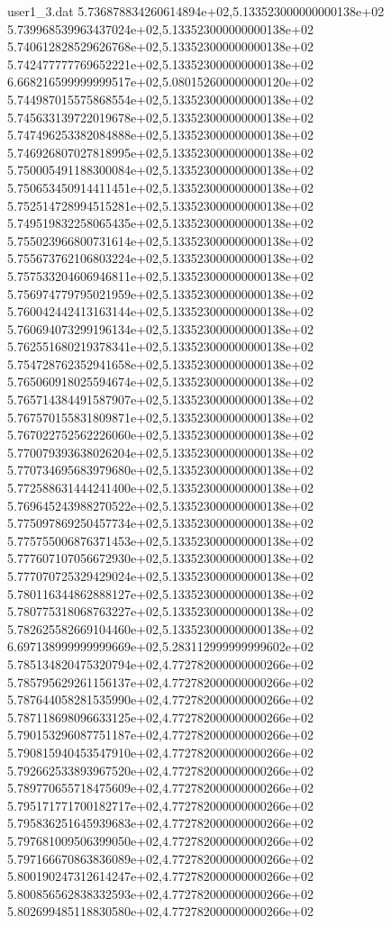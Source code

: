 \begin{filecontents}{user1_3.dat}
5.736878834260614894e+02,5.133523000000000138e+02
5.739968539963437024e+02,5.133523000000000138e+02
5.740612828529626768e+02,5.133523000000000138e+02
5.742477777769652221e+02,5.133523000000000138e+02
6.668216599999999517e+02,5.080152600000000120e+02
5.744987015575868554e+02,5.133523000000000138e+02
5.745633139722019678e+02,5.133523000000000138e+02
5.747496253382084888e+02,5.133523000000000138e+02
5.746926807027818995e+02,5.133523000000000138e+02
5.750005491188300084e+02,5.133523000000000138e+02
5.750653450914411451e+02,5.133523000000000138e+02
5.752514728994515281e+02,5.133523000000000138e+02
5.749519832258065435e+02,5.133523000000000138e+02
5.755023966800731614e+02,5.133523000000000138e+02
5.755673762106803224e+02,5.133523000000000138e+02
5.757533204606946811e+02,5.133523000000000138e+02
5.756974779795021959e+02,5.133523000000000138e+02
5.760042442413163144e+02,5.133523000000000138e+02
5.760694073299196134e+02,5.133523000000000138e+02
5.762551680219378341e+02,5.133523000000000138e+02
5.754728762352941658e+02,5.133523000000000138e+02
5.765060918025594674e+02,5.133523000000000138e+02
5.765714384491587907e+02,5.133523000000000138e+02
5.767570155831809871e+02,5.133523000000000138e+02
5.767022752562226060e+02,5.133523000000000138e+02
5.770079393638026204e+02,5.133523000000000138e+02
5.770734695683979680e+02,5.133523000000000138e+02
5.772588631444241400e+02,5.133523000000000138e+02
5.769645243988270522e+02,5.133523000000000138e+02
5.775097869250457734e+02,5.133523000000000138e+02
5.775755006876371453e+02,5.133523000000000138e+02
5.777607107056672930e+02,5.133523000000000138e+02
5.777070725329429024e+02,5.133523000000000138e+02
5.780116344862888127e+02,5.133523000000000138e+02
5.780775318068763227e+02,5.133523000000000138e+02
5.782625582669104460e+02,5.133523000000000138e+02
6.697138999999999669e+02,5.283112999999999602e+02
5.785134820475320794e+02,4.772782000000000266e+02
5.785795629261156137e+02,4.772782000000000266e+02
5.787644058281535990e+02,4.772782000000000266e+02
5.787118698096633125e+02,4.772782000000000266e+02
5.790153296087751187e+02,4.772782000000000266e+02
5.790815940453547910e+02,4.772782000000000266e+02
5.792662533893967520e+02,4.772782000000000266e+02
5.789770655718475609e+02,4.772782000000000266e+02
5.795171771700182717e+02,4.772782000000000266e+02
5.795836251645939683e+02,4.772782000000000266e+02
5.797681009506399050e+02,4.772782000000000266e+02
5.797166670863836089e+02,4.772782000000000266e+02
5.800190247312614247e+02,4.772782000000000266e+02
5.800856562838332593e+02,4.772782000000000266e+02
5.802699485118830580e+02,4.772782000000000266e+02

\end{filecontents}
